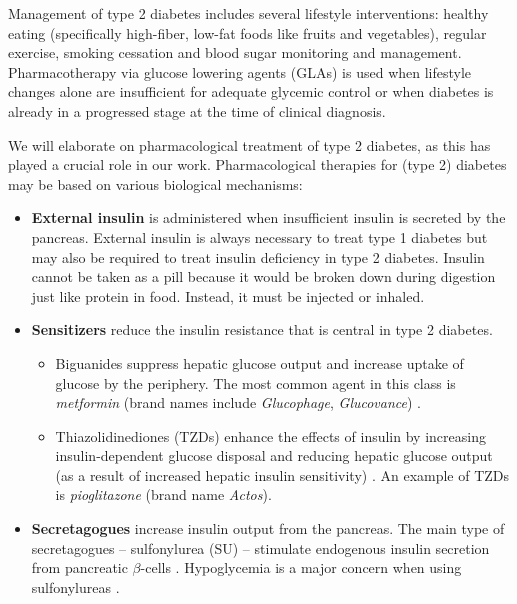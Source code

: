 Management of type 2 diabetes includes several lifestyle interventions: healthy eating (specifically high-fiber, low-fat foods like fruits and vegetables), regular exercise, smoking cessation and blood sugar monitoring and management. Pharmacotherapy via glucose lowering agents (GLAs) is used when lifestyle changes alone are insufficient for adequate glycemic control or when diabetes is already in a progressed stage at the time of clinical diagnosis. 

We will elaborate on pharmacological treatment of type 2 diabetes, as this has played a crucial role in our work. Pharmacological therapies for (type 2) diabetes may be based on various biological mechanisms:
\begin{itemize}
\item \textbf{External insulin} is administered when insufficient insulin is secreted by the pancreas. External insulin is always necessary to treat type 1 diabetes but may also be required to treat insulin deficiency in type 2 diabetes. Insulin cannot be taken as a pill because it would be broken down during digestion just like protein in food. Instead, it must be injected or inhaled. \\
\item \textbf{Sensitizers} reduce the insulin resistance that is central in type 2 diabetes.
\begin{itemize}
        \item Biguanides suppress hepatic glucose output and increase uptake of glucose by the periphery. The most common agent in this class is \emph{metformin} (brand names include \emph{Glucophage}, \emph{Glucovance}) \citep{kirpichnikov2002metformin}. \\ %
        \item Thiazolidinediones (TZDs) enhance the effects of insulin by increasing insulin-dependent glucose disposal and reducing hepatic glucose output (as a result of increased hepatic insulin sensitivity) \citep{saltiel1996thiazolidinediones, yki2004thiazolidinediones}. 
        An example of TZDs is \emph{pioglitazone} (brand name \emph{Actos}). \\
\end{itemize}
\item \textbf{Secretagogues} increase insulin output from the pancreas. The main type of secretagogues -- sulfonylurea (SU) -- stimulate endogenous insulin secretion from pancreatic $\beta$-cells \citep{proks2002sulfonylurea}. Hypoglycemia is a major concern when using sulfonylureas \citep{bodmer2008metformin}.

\end{itemize}
